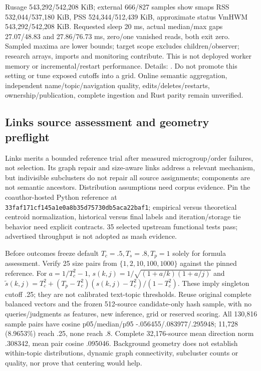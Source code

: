 \documentclass[11pt]{article}
\begin{document}
Rusage 543,292/542,208 KiB; external 666/827 samples show smaps RSS
532,044/537,180 KiB, PSS 524,344/512,439 KiB, approximate status VmHWM
543,292/542,208 KiB. Requested sleep 20 ms, actual median/max gaps 27.07/48.83
and 27.86/76.73 ms, zero/one vanished reads, both exit zero. Sampled maxima
are lower bounds; target scope excludes children/observer; research arrays,
imports and monitoring contribute. This is not deployed worker memory or
incremental/restart performance. Details:
.
Do not promote this setting or tune exposed cutoffs into a grid. Online semantic
aggregation, independent name/topic/navigation quality, edits/deletes/restarts,
ownership/publication, complete ingestion and Rust parity remain unverified.

\subsection{Links source assessment and geometry preflight}
Links \cite{mansfield2018links} merits a bounded reference trial after measured
microgroup/order failures, not selection. Its graph repair and size-aware links
address a relevant mechanism, but indivisible subclusters do not repair all
source assignments; components are not semantic ancestors. Distribution assumptions
need corpus evidence. Pin the coauthor-hosted Python reference at
\texttt{33faf171cf145a1e0a8b35d75730db5aca22baf1}; empirical versus theoretical
centroid normalization, historical versus final labels and iteration/storage tie
behavior need explicit contracts. 35 selected upstream functional tests pass;
advertised throughput is not adopted as mash evidence.

Before outcomes freeze default $T_c=.5,T_s=.8,T_p=1$ solely for formula assessment.
Verify 25 size pairs from $\{1,2,10,100,1000\}$ against the pinned reference.
For $a=1/T_c^2-1$, $s(k,j)=1/\sqrt{(1+a/k)(1+a/j)}$ and
$\tilde{s}(k,j)=T_c^2+(T_p-T_c^2)(s(k,j)-T_c^2)/(1-T_c^2)$.
These imply singleton cutoff .25; they are not calibrated text-topic thresholds.
Reuse original complete balanced vectors and the frozen 512-source candidate-only
hash sample, with no queries/judgments as features, new inference, grid or reserved
scoring. All 130,816 sample pairs have cosine p05/median/p95
-.056455/.083977/.295948; 11,728 (8.9653\%) reach .25, none reach .8.
Complete 32,176-source mean direction norm .308342, mean pair cosine .095046.
Background geometry does not establish within-topic distributions, dynamic graph
connectivity, subcluster counts or quality, nor prove that centering would help.
\end{document}
